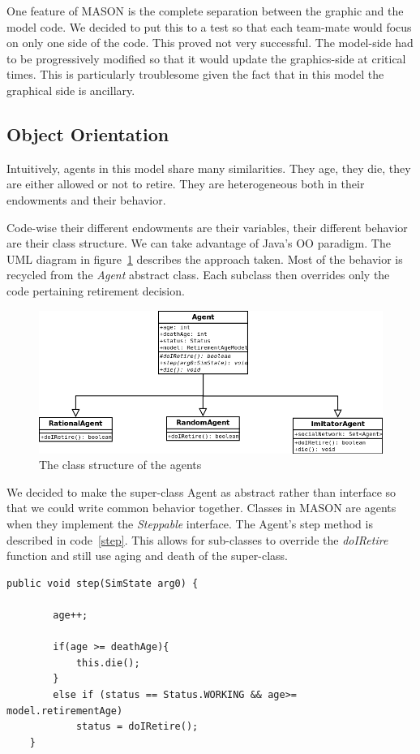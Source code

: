 \documentclass[runningheads,a4paper]{article}
\begin{document}
One feature of MASON is the complete separation between the graphic and the model code.
We decided to put this to a test so that each team-mate would focus on only one side of the code.
This proved not very successful.
The model-side had to be progressively modified so that it would update the graphics-side at critical times.
This is particularly troublesome given the fact that in this model the graphical side is ancillary.

\subsection{Object Orientation}

Intuitively, agents in this model share many similarities.
They age, they die, they are either allowed or not to retire.
They are heterogeneous both in their endowments and their behavior.

Code-wise their different endowments are their variables, their different behavior are their class structure.
We can take advantage of Java's OO paradigm.
The UML diagram in figure~\ref{UML} describes the approach taken.
Most of the behavior is recycled from the \textit{Agent} abstract class.
Each subclass then overrides only the code pertaining retirement decision.

\begin{figure}
 \begin{center}
  \includegraphics[scale=.45]{figs/UML.png}
\caption{The class structure of the agents}
\label{UML}
 \end{center}
\end{figure}

We decided to make the super-class Agent as abstract rather than interface so that we could write common behavior together.
Classes in MASON are agents when they implement the \textit{Steppable} interface.
The Agent's step method is described in code~\ref{step}.
This allows for sub-classes to override the \textit{doIRetire} function and still use aging and death of the super-class.
{
\linespread{1}
\begin{lstlisting}[float,caption= {Agent's step class}, label={step}]
public void step(SimState arg0) {
		
		age++;

		if(age >= deathAge){
			this.die();
		}
		else if (status == Status.WORKING && age>= model.retirementAge)	
			status = doIRetire();	
	}

\end{lstlisting}
}
\end{document}
